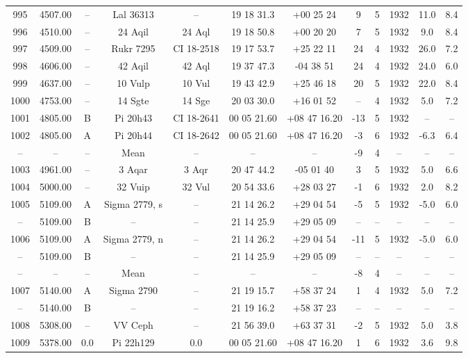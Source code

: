 \begin{table}
\begin{tabular}{cccccccccccc}
995 & 4507.00 & -- & Lal 36313 & -- & 19 18 31.3 & +00 25 24 & 9 & 5 & 1932 & 11.0 & 8.4 \\
996 & 4510.00 & -- & 24 Aqil & 24 Aql & 19 18 50.8 & +00 20 20 & 7 & 5 & 1932 & 9.0 & 8.4 \\
997 & 4509.00 & -- & Rukr 7295 & CI 18-2518 & 19 17 53.7 & +25 22 11 & 24 & 4 & 1932 & 26.0 & 7.2 \\
998 & 4606.00 & -- & 42 Aqil & 42 Aql & 19 37 47.3 & -04 38 51 & 24 & 4 & 1932 & 24.0 & 6.0 \\
999 & 4637.00 & -- & 10 Vulp & 10 Vul & 19 43 42.9 & +25 46 18 & 20 & 5 & 1932 & 22.0 & 8.4 \\
1000 & 4753.00 & -- & 14 Sgte & 14 Sge & 20 03 30.0 & +16 01 52 & -- & 4 & 1932 & 5.0 & 7.2 \\
1001 & 4805.00 & B & Pi 20h43 & CI 18-2641 & 00 05 21.60 & +08 47 16.20 & -13 & 5 & 1932 & -- & -- \\
1002 & 4805.00 & A & Pi 20h44 & CI 18-2642 & 00 05 21.60 & +08 47 16.20 & -3 & 6 & 1932 & -6.3 & 6.4 \\
-- & -- & -- & Mean & -- & -- & -- & -9 & 4 & -- & -- & -- \\
1003 & 4961.00 & -- & 3 Aqar & 3 Aqr & 20 47 44.2 & -05 01 40 & 3 & 5 & 1932 & 5.0 & 6.6 \\
1004 & 5000.00 & -- & 32 Vuip & 32 Vul & 20 54 33.6 & +28 03 27 & -1 & 6 & 1932 & 2.0 & 8.2 \\
1005 & 5109.00 & A & Sigma 2779, s & -- & 21 14 26.2 & +29 04 54 & -5 & 5 & 1932 & -5.0 & 6.0 \\
-- & 5109.00 & B & -- & -- & 21 14 25.9 & +29 05 09 & -- & -- & -- & -- & -- \\
1006 & 5109.00 & A & Sigma 2779, n & -- & 21 14 26.2 & +29 04 54 & -11 & 5 & 1932 & -5.0 & 6.0 \\
-- & 5109.00 & B & -- & -- & 21 14 25.9 & +29 05 09 & -- & -- & -- & -- & -- \\
-- & -- & -- & Mean & -- & -- & -- & -8 & 4 & -- & -- & -- \\
1007 & 5140.00 & A & Sigma 2790 & -- & 21 19 15.7 & +58 37 24 & 1 & 4 & 1932 & 5.0 & 7.2 \\
-- & 5140.00 & B & -- & -- & 21 19 16.2 & +58 37 23 & -- & -- & -- & -- & -- \\
1008 & 5308.00 & -- & VV Ceph & -- & 21 56 39.0 & +63 37 31 & -2 & 5 & 1932 & 5.0 & 3.8 \\
1009 & 5378.00 & 0.0 & Pi 22h129 & 0.0 & 00 05 21.60 & +08 47 16.20 & 1 & 6 & 1932 & 3.6 & 9.8 \\

\end{tabular}
\end{table}
